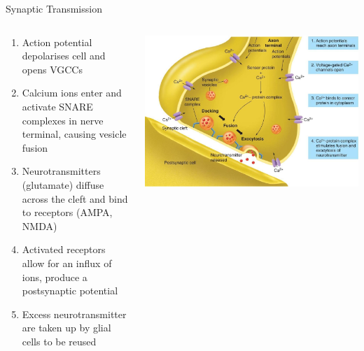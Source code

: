 \documentclass{beamer}
\begin{document}
\begin{frame}{Synaptic Transmission}
\begin{columns}
\begin{column}{0.47\textwidth}
\begin{enumerate} \tiny
    \item<1->Action potential depolarises cell and opens VGCCs
    \item<2->Calcium ions enter and activate SNARE complexes in nerve terminal, causing vesicle fusion
    \item<3->Neurotransmitters (glutamate) diffuse across the cleft and bind to receptors (AMPA, NMDA)
    \item<4->Activated receptors allow for an influx of ions, produce a postsynaptic potential
    \item<5->Excess neurotransmitter are taken up by glial cells to be reused
\end{enumerate}
    \end{column}
    \begin{column}{0.5\textwidth}
    \includegraphics[width=1\textwidth]{fig1.jpg}
    \end{column}
\end{columns}
\end{frame}
\end{document}
